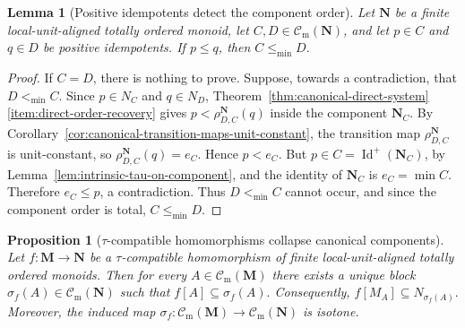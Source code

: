 \documentclass[pdflatex,sn-mathphys-num]{sn-jnl}
\theoremstyle{thmstyleone}%
\newtheorem{proposition}[theorem]{Proposition}
\newtheorem{lemma}[theorem]{Lemma}
\theoremstyle{thmstyletwo}%
\theoremstyle{thmstylethree}%
\newcommand{\PosId}{\operatorname{Id}^{+}}
\newcommand{\Cm}{\mathcal C_{\mathrm m}}
\begin{document}
\begin{lemma}[Positive idempotents detect the component order]
\label{lem:positive-idempotents-detect-component-order}
Let \(\mathbf N\) be a finite local-unit-aligned totally ordered monoid, let \(C,D\in\Cm(\mathbf N)\), and let \(p\in C\) and \(q\in D\) be positive idempotents.
If \(p\le q\), then \(C\le_{\min}D. \)
\end{lemma}

\begin{proof}
If \(C=D\), there is nothing to prove.
Suppose, towards a contradiction, that \(D<_{\min}C\).
Since \(p\in N_C\) and \(q\in N_D\), Theorem~\ref{thm:canonical-direct-system}\eqref{item:direct-order-recovery} gives \(p<\rho^{\mathbf N}_{D,C}(q)\) inside the component \(\mathbf N_C\).
By Corollary~\ref{cor:canonical-transition-maps-unit-constant}, the transition map \(\rho^{\mathbf N}_{D,C}\) is unit-constant, so \(\rho^{\mathbf N}_{D,C}(q)=e_C\).
Hence \(p<e_C\).
But \(p\in C=\PosId(\mathbf N_C)\), by Lemma~\ref{lem:intrinsic-tau-on-component}, and the identity of \(\mathbf N_C\) is \(e_C=\min C\).
Therefore \(e_C\le p\), a contradiction.
Thus \(D<_{\min}C\) cannot occur, and since the component order is total, \(C\le_{\min}D\).
\end{proof}

\begin{proposition}[\(\tau\)-compatible homomorphisms collapse canonical components]
\label{prop:taucomp-homomorphisms-collapse-components}
Let \(f\colon \mathbf M\to \mathbf N \) be a \(\tau\)-compatible homomorphism of finite local-unit-aligned totally ordered monoids.
Then for every \(A\in\Cm(\mathbf M)\) there exists a unique block \(\sigma_f(A)\in\Cm(\mathbf N)\) such that \(f[A]\subseteq \sigma_f(A). \)
Consequently, \(f[M_A]\subseteq N_{\sigma_f(A)}. \)
Moreover, the induced map \(\sigma_f\colon \Cm(\mathbf M)\to\Cm(\mathbf N) \) is isotone.
\end{proposition}
\end{document}
